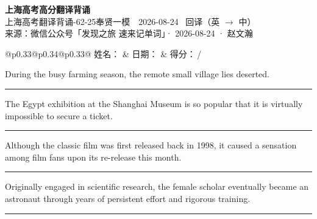 \documentclass[11pt,a4paper]{article}
\newcommand{\num}[1]{\makebox[1.9em][r]{#1.}\hspace{0.3em}}
\newcommand{\wline}{\noindent\rule{\linewidth}{0.4pt}}
\begin{document}
\pagestyle{plain}
\begin{center}
{\LARGE\bfseries 上海高考高分翻译背诵 }\\[0.25em]
{\large 上海高考翻译背诵-62-25奉贤一模　2026-08-24 \quad\ 回译（英 $\to$ 中）}\\[0.35em]
{\footnotesize 来源：微信公众号「发现之旅 速来记单词」· 2026-08-24 · 赵文瀚}
\end{center}

\vspace{0.4em}
\noindent\begin{tabular}{@{}p{0.33\textwidth}@{}p{0.34\textwidth}@{}p{0.33\textwidth}@{}}
姓名：\underline{\hspace{2.0cm}} & 日期：\underline{\hspace{2.0cm}} & 得分：\underline{\hspace{1.4cm}}\,/ \\
\end{tabular}

\vspace{0.5em}

\vspace{0.8em}
\num{1}During the busy farming season, the remote small village lies deserted.

\vspace{0.25em}

\wline

\num{2}The Egypt exhibition at the Shanghai Museum is so popular that it is virtually impossible to secure a ticket.

\vspace{0.25em}

\wline

\num{3}Although the classic film was first released back in 1998, it caused a sensation among film fans upon its re-release this month.

\vspace{0.25em}

\wline

\num{4}Originally engaged in scientific research, the female scholar eventually became an astronaut through years of persistent effort and rigorous training.

\vspace{0.25em}

\wline
\end{document}
